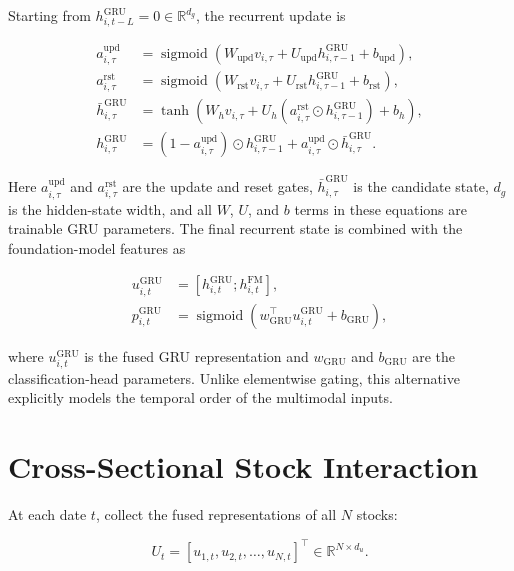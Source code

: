 \documentclass[11pt]{article}
\newcommand{\R}{\mathbb{R}}
\newcommand{\sigmoid}{\operatorname{sigmoid}}
\begin{document}
Starting from $h^{\mathrm{GRU}}_{i,t-L}=0\in\R^{d_g}$, the recurrent update is

\begin{align}
a^{\mathrm{upd}}_{i,\tau}
&=
\sigmoid\left(
W_{\mathrm{upd}}v_{i,\tau}
+U_{\mathrm{upd}}h^{\mathrm{GRU}}_{i,\tau-1}
+b_{\mathrm{upd}}
\right),\\
a^{\mathrm{rst}}_{i,\tau}
&=
\sigmoid\left(
W_{\mathrm{rst}}v_{i,\tau}
+U_{\mathrm{rst}}h^{\mathrm{GRU}}_{i,\tau-1}
+b_{\mathrm{rst}}
\right),\\
\bar h^{\mathrm{GRU}}_{i,\tau}
&=
\tanh\left(
W_hv_{i,\tau}
+U_h\left(
a^{\mathrm{rst}}_{i,\tau}
\odot
h^{\mathrm{GRU}}_{i,\tau-1}
\right)
+b_h
\right),\\
h^{\mathrm{GRU}}_{i,\tau}
&=
\left(1-a^{\mathrm{upd}}_{i,\tau}\right)
\odot h^{\mathrm{GRU}}_{i,\tau-1}
+a^{\mathrm{upd}}_{i,\tau}
\odot\bar h^{\mathrm{GRU}}_{i,\tau}.
\end{align}

Here $a^{\mathrm{upd}}_{i,\tau}$ and $a^{\mathrm{rst}}_{i,\tau}$ are the
update and reset gates, $\bar h^{\mathrm{GRU}}_{i,\tau}$ is the candidate
state, $d_g$ is the hidden-state width, and all $W$, $U$, and $b$ terms in
these equations are trainable GRU parameters. The final recurrent state is
combined with the foundation-model features as

\begin{align}
u^{\mathrm{GRU}}_{i,t}
&=
\left[
h^{\mathrm{GRU}}_{i,t};
h^{\mathrm{FM}}_{i,t}
\right],\\
p^{\mathrm{GRU}}_{i,t}
&=
\sigmoid\left(
w_{\mathrm{GRU}}^\top u^{\mathrm{GRU}}_{i,t}
+b_{\mathrm{GRU}}
\right),
\end{align}

where $u^{\mathrm{GRU}}_{i,t}$ is the fused GRU representation and
$w_{\mathrm{GRU}}$ and $b_{\mathrm{GRU}}$ are the classification-head
parameters. Unlike elementwise gating, this alternative explicitly models
the temporal order of the multimodal inputs.

\section{Cross-Sectional Stock Interaction}

At each date $t$, collect the fused representations of all $N$ stocks:

\begin{equation}
U_t
=
\left[
u_{1,t},
u_{2,t},
\ldots,
u_{N,t}
\right]^\top
\in
\R^{N\times d_u}.
\end{equation}
\end{document}
